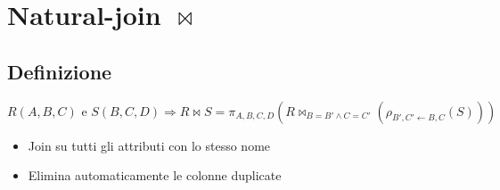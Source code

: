 \newpage
\section{Natural-join $\bowtie$}
\subsection{Definizione}
\[
R(A,B,C) \text{ e } S(B,C,D) \Rightarrow R \bowtie S = \pi_{A,B,C,D} \left( R \bowtie_{B=B' \land C=C'} (\rho_{B',C' \leftarrow B,C}(S)) \right)
\]
\begin{itemize}
    \item Join su tutti gli attributi con lo stesso nome
    \item Elimina automaticamente le colonne duplicate
\end{itemize}

